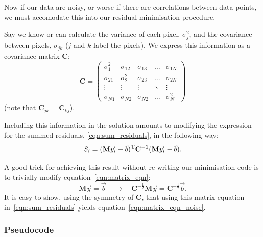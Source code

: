 \documentclass[letterpaper, 11pt]{article}
\begin{document}
Now if our data are noisy, or worse if there are correlations between data points, we must accomodate this into our residual-minimisation procedure.

Say we know or can calculate the variance of each pixel, $\sigma_j^2$, and the covariance between pixels, $\sigma_{jk}$ ($j$ and $k$ label the pixels).  We express this information as a covariance matrix $\mathbf{C}$:
\begin{equation}
	\mathbf{C} =
	\begin{pmatrix}
		\sigma_1^2	& \sigma_{12}	& \sigma_{13}	& \ldots	& \sigma_{1N}\\
		\sigma_{21}	& \sigma_2^2	& \sigma_{23}	& \ldots 	& \sigma_{2N}\\
		\vdots		& \vdots 		&  \vdots		& \ddots & \vdots \\
		\sigma_{N1}	& \sigma_{N2} 	& \sigma_{N2}	& \ldots	& \sigma_N^2
	\end{pmatrix}
\end{equation}
(note that $\mathbf{C}_{jk}=\mathbf{C}_{kj}$).

Including this information in the solution amounts to modifying the expression for the summed residuals, \ref{eqn:sum_residuals}, in the following way:
\begin{equation}\label{eqn:matrix_eqn_noise}
	S_i = (\mathbf M \vec{y_i} - \vec b)^{\rm T}\mathbf{C}^{-1}(\mathbf M \vec{y_i} - \vec b).
\end{equation}

A good trick for achieving this result without re-writing our minimisation code is to trivially modify equation~\ref{eqn:matrix_eqn}:
\begin{equation}
	\mathbf M \vec y = \vec b \quad\longrightarrow\quad \mathbf{C}^{-\frac{1}{2}}\mathbf{M} \vec y = \mathbf{C}^{-\frac{1}{2}}\vec b.
\end{equation}
It is easy to show, using the symmetry of $\mathbf{C}$, that using this matrix equation in~\ref{eqn:sum_residuals} yields equation~\ref{eqn:matrix_eqn_noise}.



\subsubsection{Pseudocode}
\end{document}
